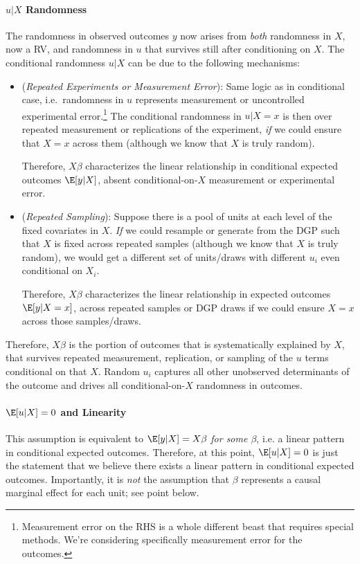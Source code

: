 \documentclass[12pt]{article}
\theoremstyle{plain}
\theoremstyle{definition}
\theoremstyle{remark}
\begin{document}
\paragraph{$u|X$ Randomness}
The randomness in observed outcomes $y$ now arises from \emph{both}
randomness in $X$, now a RV, and randomness in $u$ that survives
still after conditioning on $X$.
The conditional randomness $u|X$ can be due to the following
mechanisms:
\begin{itemize}
  \item (\emph{Repeated Experiments or Measurement Error}):
    Same logic as in conditional case, i.e.\ randomness in $u$
    represents measurement or uncontrolled experimental
    error.\footnote{%
      Measurement error on the RHS is a whole different beast that
      requires special methods.
      We're considering specifically measurement error for the
      outcomes.
    }
    The conditional randomness in $u|X=x$ is then over repeated
    measurement or replications of the experiment, \emph{if} we
    could ensure that $X=x$ across them (although we know that $X$
    is truly random).

    Therefore, $X\beta$ characterizes the linear relationship in
    conditional expected outcomes $\E[y|X]$,
    absent conditional-on-$X$ measurement or experimental error.

  \item (\emph{Repeated Sampling}):
    Suppose there is a pool of units at each level of the fixed
    covariates in $X$.
    \emph{If} we could resample or generate from the DGP such that
    $X$ is fixed across repeated samples (although we know that $X$
    is truly random), we would get a different set of units/draws
    with different $u_i$ even conditional on $X_i$.

    Therefore, $X\beta$ characterizes the linear relationship in
    expected outcomes $\E[y|X=x]$,
    across repeated samples or DGP draws if we could ensure $X=x$
    across those samples/draws.
\end{itemize}
Therefore, $X\beta$ is the portion of outcomes that is
systematically explained by $X$, that survives repeated measurement,
replication, or sampling of the $u$ terms conditional on that $X$.
Random $u_i$ captures all other unobserved determinants of the
outcome and drives all conditional-on-$X$ randomness in outcomes.

\paragraph{$\E[u|X]=0$ and Linearity}
This assumption is equivalent to $\E[y|X]=X\beta$
\emph{for some $\beta$},
i.e. a linear pattern in conditional expected outcomes.
Therefore, at this point, $\E[u|X]=0$ is just the statement that we
believe there exists a linear pattern in conditional expected outcomes.
Importantly, it is \emph{not} the assumption that $\beta$ represents
a causal marginal effect for each unit; see point below.
\end{document}

